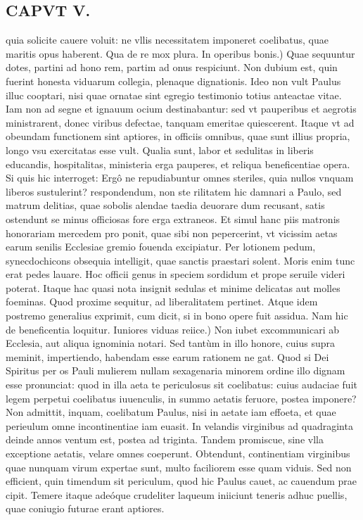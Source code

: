 \documentclass{article}
\begin{document}
\begin{pages}
\section*{CAPVT V. }
\marginpar{[ p.61 ]}\pstart quia solicite cauere voluit: ne vllis necessitatem imponeret coelibatus, quae maritis opus haberent. Qua de re mox plura.  \pend\pstart In operibus bonis.) Quae sequuntur dotes, partini ad hono rem, partim ad onus respiciunt. Non dubium est, quin fuerint honesta viduarum collegia, plenaque dignationis. Ideo non vult Paulus illuc cooptari, nisi quae ornatae sint egregio testimonio totius anteactae vitae. Iam non ad segne et ignauum ocium destinabantur: sed vt pauperibus et aegrotis ministrarent, donec viribus defectae, tanquam emeritae quiescerent. Itaque vt ad obeundam functionem sint aptiores, in officiis omnibus, quae sunt illius propria, longo vsu exercitatas esse vult. Qualia sunt, labor et sedulitas in liberis educandis, hospitalitas, ministeria erga pauperes, et reliqua beneficentiae opera. Si quis hic interroget: Ergô ne repudiabuntur omnes steriles, quia nullos vnquam liberos sustulerint? respondendum, non ste rilitatem hic damnari a Paulo, sed matrum delitias, quae sobolis alendae taedia deuorare dum recusant, satis ostendunt se minus officiosas fore erga extraneos. Et simul hanc piis matronis honorariam mercedem pro ponit, quae sibi non pepercerint, vt vicissim aetas earum senilis Ecclesiae gremio fouenda excipiatur. Per lotionem pedum, synecdochicons obsequia intelligit, quae sanctis praestari solent. Moris enim tunc erat pedes lauare. Hoc officii genus in speciem sordidum et prope seruile videri poterat. Itaque hac quasi nota insignit sedulas et minime delicatas aut molles foeminas. Quod proxime sequitur, ad liberalitatem pertinet. Atque idem postremo generalius exprimit, cum dicit, si in bono opere fuit assidua. Nam hic de beneficentia loquitur.  \pend\pstart Iuniores viduas reiice.) Non iubet excommunicari ab Ecclesia, aut aliqua ignominia notari. Sed tantùm in illo honore, cuius supra meminit, impertiendo, habendam esse earum rationem ne gat. Quod si Dei Spiritus per os Pauli mulierem nullam sexagenaria minorem ordine illo dignam esse pronunciat: quod in illa aeta te periculosus sit coelibatus: cuius audaciae fuit legem perpetui coelibatus iuuenculis, in summo aetatis feruore, postea imponere? Non admittit, inquam, coelibatum Paulus, nisi in aetate iam effoeta, et quae perieulum omne incontinentiae iam euasit. In velandis virginibus ad quadraginta deinde annos ventum est, postea ad triginta. Tandem promiscue, sine vlla exceptione aetatis, velare omnes coeperunt. Obtendunt, continentiam virginibus quae nunquam virum expertae sunt, multo faciliorem esse quam viduis. Sed non efficient, quin timendum sit periculum, quod hic Paulus cauet, ac cauendum prae cipit. Temere itaque adeóque crudeliter laqueum iniiciunt teneris adhuc puellis, quae coniugio futurae erant aptiores.  \pend

\end{pages}
\end{document}

